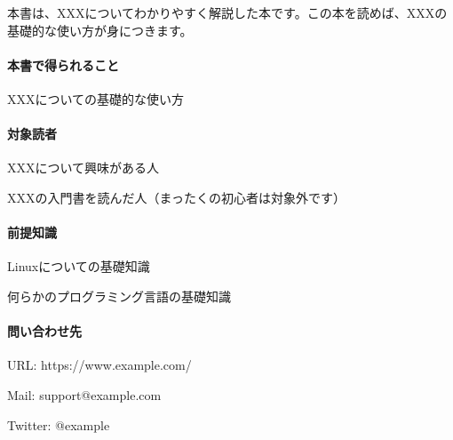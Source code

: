 本書は、XXXについてわかりやすく解説した本です。この本を読めば、XXXの基礎的な使い方が身につきます。

\paragraph*{本書で得られること}
\label{sec:-0-0-0-1}

\begin{starteritemize}
\item XXXについての基礎的な使い方
\end{starteritemize}

\paragraph*{対象読者}
\label{sec:-0-0-0-2}

\begin{starteritemize}
\item XXXについて興味がある人
\item XXXの入門書を読んだ人（まったくの初心者は対象外です）
\end{starteritemize}

\paragraph*{前提知識}
\label{sec:-0-0-0-3}

\begin{starteritemize}
\item Linuxについての基礎知識
\item 何らかのプログラミング言語の基礎知識
\end{starteritemize}

\paragraph*{問い合わせ先}
\label{sec:-0-0-0-4}

\begin{starteritemize}
\item URL: https://www.example.com/
\item Mail: support@example.com
\item Twitter: @example
\end{starteritemize}

